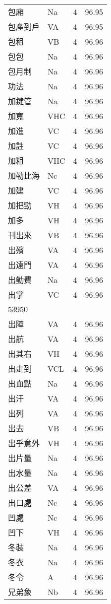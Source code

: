 \documentclass[twocolumn]{book}
\begin{document}
\begin{supertabular}{llrr}
包廂 & Na & 4 &  96.95\\
包產到戶 & VA & 4 &  96.95\\
包租 & VB & 4 &  96.96\\
包包 & Na & 4 &  96.96\\
包月制 & Na & 4 &  96.96\\
功法 & Na & 4 &  96.96\\
加鍵管 & Na & 4 &  96.96\\
加寬 & VHC & 4 &  96.96\\
加進 & VC & 4 &  96.96\\
加註 & VC & 4 &  96.96\\
加粗 & VHC & 4 &  96.96\\
加勒比海 & Nc & 4 &  96.96\\
加建 & VC & 4 &  96.96\\
加把勁 & VH & 4 &  96.96\\
加多 & VH & 4 &  96.96\\
刊出來 & VB & 4 &  96.96\\
出殯 & VA & 4 &  96.96\\
出遠門 & VA & 4 &  96.96\\
出勤費 & Na & 4 &  96.96\\
出掌 & VC & 4 &  96.96\\
53950\\
出陣 & VA & 4 &  96.96\\
出航 & VA & 4 &  96.96\\
出其右 & VH & 4 &  96.96\\
出走到 & VCL & 4 &  96.96\\
出血點 & Na & 4 &  96.96\\
出汗 & VA & 4 &  96.96\\
出列 & VA & 4 &  96.96\\
出去 & VB & 4 &  96.96\\
出乎意外 & VH & 4 &  96.96\\
出片量 & Na & 4 &  96.96\\
出水量 & Na & 4 &  96.96\\
出公差 & VA & 4 &  96.96\\
出口處 & Nc & 4 &  96.96\\
凹處 & Nc & 4 &  96.96\\
凹下 & VH & 4 &  96.96\\
冬裝 & Na & 4 &  96.96\\
冬衣 & Na & 4 &  96.96\\
冬令 & A & 4 &  96.96\\
兄弟象 & Nb & 4 &  96.96\\

\end{supertabular}
\end{document}
